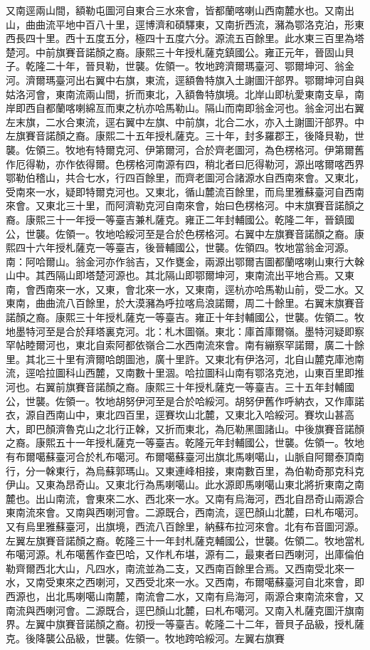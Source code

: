 \begin{pinyinscope}
又南逕兩山間，額勒屯圖河自東合三水來會，皆都蘭喀喇山西南麓水也。又南出山，曲曲流平地中百八十里，逕博濟和碩驛東，又南折西流，瀦為鄂洛克泊，形東西長四十里。西十五度五分，極四十五度六分。源流五百餘里。此水東三百里為塔楚河。中前旗賽音諾顏之裔。康熙三十年授札薩克鎮國公。雍正元年，晉固山貝子。乾隆二十年，晉貝勒，世襲。佐領一。牧地跨濟爾瑪臺河、鄂爾坤河、翁金河。濟爾瑪臺河出右翼中右旗，東流，逕額魯特旗入土謝圖汗部界。鄂爾坤河自與姑洛河會，東南流兩山間，折而東北，入額魯特旗境。北岸山即杭愛東南支阜，南岸即西自都蘭喀喇綿亙而東之杭亦哈馬勒山。隔山而南即翁金河也。翁金河出右翼左末旗，二水合東流，逕右翼中左旗、中前旗，北合二水，亦入土謝圖汗部界。中左旗賽音諾顏之裔。康熙二十五年授札薩克。三十年，封多羅郡王，後降貝勒，世襲。佐領三。牧地有特爾克河、伊第爾河，合於齊老圖河，為色楞格河。伊第爾舊作厄得勒，亦作依得爾。色楞格河南源有四，稍北者曰厄得勒河，源出喀爾喀西界鄂勒伯稽山，共合七水，行四百餘里，而齊老圖河合諸源水自西南來會。又東北，受南來一水，疑即特爾克河也。又東北，循山麓流百餘里，而烏里雅蘇臺河自西南來會。又東北三十里，而阿濟勒克河自南來會，始曰色楞格河。中末旗賽音諾顏之裔。康熙三十一年授一等臺吉兼札薩克。雍正二年封輔國公。乾隆二年，晉鎮國公，世襲。佐領一。牧地哈綏河至是合於色楞格河。右翼中左旗賽音諾顏之裔。康熙四十六年授札薩克一等臺吉，後晉輔國公，世襲。佐領四。牧地當翁金河源。南：阿哈爾山。翁金河亦作翁吉，又作甕金，兩源出鄂爾吉圖都蘭喀喇山東行大榦山中。其西隔山即塔楚河源也。其北隔山即鄂爾坤河，東南流出平地合焉。又東南，會西南來一水，又東，會北來一水，又東南，逕杭亦哈馬勒山前，受二水。又東南，曲曲流八百餘里，於大漠瀦為呼拉喀烏浪諾爾，周二十餘里。右翼末旗賽音諾顏之裔。康熙三十年授札薩克一等臺吉。雍正十年封輔國公，世襲。佐領二。牧地墨特河至是合於拜塔裏克河。北：札木圖嶺。東北：庫首庫爾嶺。墨特河疑即察罕帖睦爾河也，東北自索阿都依嶺合二水西南流來會。南有繃察罕諾爾，廣二十餘里。其北三十里有濟爾哈朗圖池，廣十里許。又東北有伊洛河，北自山麓克庫池南流，逕哈拉圖科山西麓，又南數十里涸。哈拉圖科山南有鄂洛克池，山東百里即推河也。右翼前旗賽音諾顏之裔。康熙三十年授札薩克一等臺吉。三十五年封輔國公，世襲。佐領一。牧地胡努伊河至是合於哈綏河。胡努伊舊作呼納衣，又作庫諾衣，源自西南山中，東北四百里，逕賽坎山北麓，又東北入哈綏河。賽坎山甚高大，即巴顏濟魯克山之北行正榦，又折而東北，為厄勒黑圖諸山。中後旗賽音諾顏之裔。康熙五十一年授札薩克一等臺吉。乾隆元年封輔國公，世襲。佐領一。牧地有布爾噶蘇臺河合於札布噶河。布爾噶蘇臺河出旗北馬喇噶山，山脈自阿爾泰頂南行，分一榦東行，為烏蘇郭瑪山。又東連峰相接，東南數百里，為伯勒奇那克科克伊山。又東為昂奇山。又東北行為馬喇噶山。此水源即馬喇噶山東北將折東南之南麓也。出山南流，會東來二水、西北來一水。又南有烏海河，西北自昂奇山兩源合東南流來會。又南與西喇河會。二源既合，西南流，逕巴顏山北麓，曰札布噶河。又有烏里雅蘇臺河，出旗境，西流八百餘里，納蘇布拉河來會。北有布音圖河源。左翼左旗賽音諾顏之裔。乾隆三十一年封札薩克輔國公，世襲。佐領二。牧地當札布噶河源。札布噶舊作查巴哈，又作札布堪，源有二，最東者曰西喇河，出庫倫伯勒齊爾西北大山，凡四水，南流並為二支，又西南百餘里合焉。又西南受北來一水，又南受東來之西喇河，又西受北來一水。又西南，布爾噶蘇臺河自北來會，即西源也，出北馬喇噶山南麓，南流會二水，又南有烏海河，兩源合東南流來會，又南流與西喇河會。二源既合，逕巴顏山北麓，曰札布噶河。又南入札薩克圖汗旗南界。左翼中旗賽音諾顏之裔。初授一等臺吉。乾隆二十二年，晉貝子品級，授札薩克。後降襲公品級，世襲。佐領一。牧地跨哈綏河。左翼右旗賽
\end{pinyinscope}
